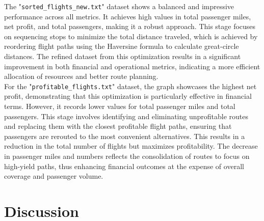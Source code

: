 \documentclass{article}
\begin{document}
The "\texttt{sorted\_flights\_new.txt}" dataset shows a balanced and impressive performance across all metrics. It achieves high values in total passenger miles, net profit, and total passengers, making it a robust approach. This stage focuses on sequencing stops to minimize the total distance traveled, which is achieved by reordering flight paths using the Haversine formula to calculate great-circle distances. The refined dataset from this optimization results in a significant improvement in both financial and operational metrics, indicating a more efficient allocation of resources and better route planning.\\

For the "\texttt{profitable\_flights.txt}" dataset, the graph showcases the highest net profit, demonstrating that this optimization is particularly effective in financial terms. However, it records lower values for total passenger miles and total passengers. This stage involves identifying and eliminating unprofitable routes and replacing them with the closest profitable flight paths, ensuring that passengers are rerouted to the most convenient alternatives. This results in a reduction in the total number of flights but maximizes profitability. The decrease in passenger miles and numbers reflects the consolidation of routes to focus on high-yield paths, thus enhancing financial outcomes at the expense of overall coverage and passenger volume.

\section{Discussion}
\end{document}
